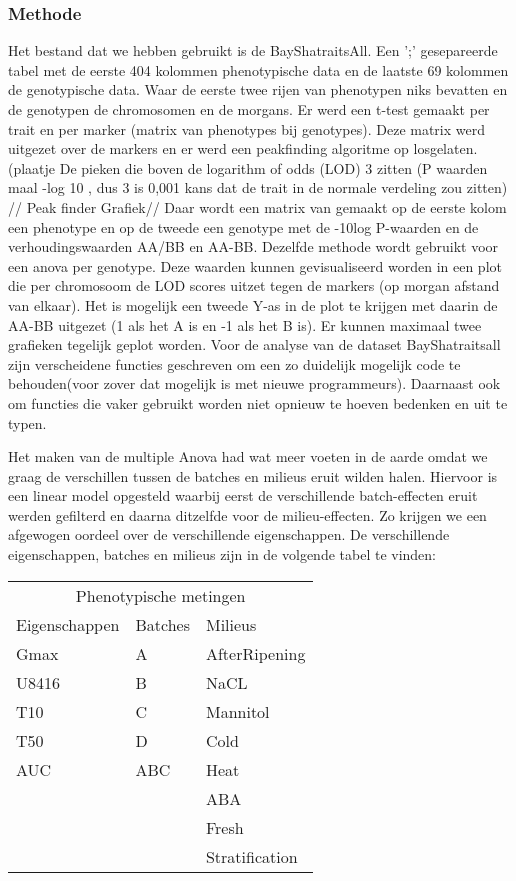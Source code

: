 \documentclass[12pt,a4paper]{article}
\begin{document}
\subsubsection*{Methode}
Het bestand dat we hebben gebruikt is de BayShatraitsAll. 
Een ';' gesepareerde tabel met de eerste 404 kolommen phenotypische data en de laatste 69 kolommen de genotypische data.
Waar de eerste twee rijen van phenotypen niks bevatten en de genotypen de chromosomen en de morgans.
Er werd een t-test gemaakt per trait en per marker (matrix van phenotypes bij genotypes).
Deze matrix werd uitgezet over de markers en er werd een peakfinding algoritme op losgelaten. (plaatje
De pieken die boven de logarithm of odds (LOD) 3 zitten (P waarden maal -log 10 , dus 3 is 0,001 kans dat de trait in de normale verdeling zou zitten) //
Peak finder Grafiek//
Daar wordt een matrix van gemaakt op de eerste kolom een phenotype en op de tweede een genotype met de -10log P-waarden en de  verhoudingswaarden AA/BB en AA-BB.
Dezelfde methode wordt gebruikt voor een anova per genotype. 
Deze waarden kunnen gevisualiseerd worden in een plot die per chromosoom de LOD scores uitzet tegen de markers (op morgan afstand van elkaar).
Het is mogelijk een tweede Y-as in de plot te krijgen met daarin de AA-BB uitgezet (1 als het A is en -1 als het B is).
Er kunnen maximaal twee grafieken tegelijk geplot worden.
Voor de analyse van de dataset BayShatraitsall zijn verscheidene functies geschreven om een zo duidelijk mogelijk code te behouden(voor zover dat mogelijk is met nieuwe programmeurs).
Daarnaast ook om functies die vaker gebruikt worden niet opnieuw te hoeven bedenken en uit te typen.

Het maken van de multiple Anova had wat meer voeten in de aarde omdat we graag de verschillen tussen de batches en milieus eruit wilden halen.
Hiervoor is een linear model opgesteld waarbij eerst de verschillende batch-effecten eruit werden gefilterd en daarna ditzelfde voor de milieu-effecten.
Zo krijgen we een afgewogen oordeel over de verschillende eigenschappen.
De verschillende eigenschappen, batches en milieus zijn in de volgende tabel te vinden:\\

\begin{tabular} {l  l  l}
\multicolumn{3}{c}{Phenotypische metingen} \\
Eigenschappen & Batches & Milieus\\ 
\hline 
Gmax & A & AfterRipening\\
U8416 & B & NaCL\\
T10 & C & Mannitol\\
T50 & D & Cold\\
AUC & ABC & Heat\\
 &  & ABA\\
 &  & Fresh\\
 &  & Stratification\\
\end{tabular}\\
\end{document}
